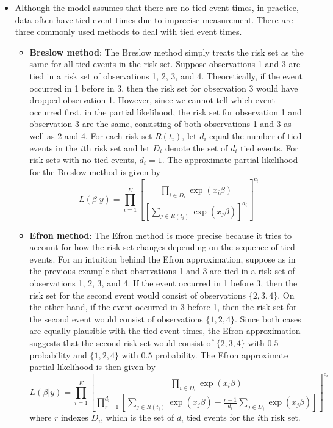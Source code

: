 \begin{itemize}
\item Although the model assumes that there are no tied event times, in practice, data often have tied event times due to imprecise measurement.  There are three commonly used methods to deal with tied event times.  
\begin{itemize}
\item \textbf{Breslow method}: The Breslow method simply treats the risk set as the same for all tied events in the risk set.  Suppose observations 1 and 3 are tied in a risk set of observations 1, 2, 3, and 4.  Theoretically, if the event occurred in 1 before in 3, then the risk set for observation 3 would have dropped observation 1.  However, since we cannot tell which event occurred first, in the partial likelihood, the risk set for observation 1 and observation 3 are the same, consisting of both observations 1 and 3 as well as 2 and 4.  For each risk set $R(t_i)$, let $d_i$ equal the number of tied events in the $i$th risk set and let $D_i$ denote the set of $d_i$ tied events.  For risk sets with no tied events, $d_i = 1$.  The approximate partial likelihood for the Breslow method is given by
\begin{equation*}
L(\beta | y) = \prod_{i=1}^K \left[ \frac{\prod_{i \in D_i}\exp(x_i \beta)}{\left[ \sum_{j \in R(t_i)} \exp(x_j \beta)\right] ^{d_i}} \right] ^ {c_i}
\end{equation*} 

\item \textbf{Efron method}: The Efron method is more precise because it tries to account for how the risk set changes depending on the sequence of tied events.  For an intuition behind the Efron approximation, suppose as in the previous example that observations 1 and 3 are tied in a risk set of observations 1, 2, 3, and 4.  If the event occurred in 1 before 3, then the risk set for the second event would consist of observations $\{2, 3, 4\}$.  On the other hand, if the event occurred in 3 before 1, then the risk set for the second event would consist of observations $\{1,2,4\}$.  Since both cases are equally plausible with the tied event times, the Efron approximation suggests that the second risk set would consist of $\{2, 3, 4\}$ with $0.5$ probability and $\{1,2,4\}$ with $0.5$ probability.  The Efron approximate partial likelihood is then given by
\begin{equation*}
L(\beta | y) = \prod_{i=1}^K \left[\frac{\prod_{i \in D_i}\exp(x_i \beta)}{\prod_{r=1}^{d_i} \left[\sum_{j \in R(t_i)} \exp(x_j \beta) - \frac{r-1}{d_i} \sum_{j \in D_i} \exp(x_j \beta)\right] } \right] ^ {c_i}  
\end{equation*}
where $r$ indexes $D_i$, which is the set of $d_i$ tied events for the $i$th risk set.


\end{itemize}
\end{itemize}
